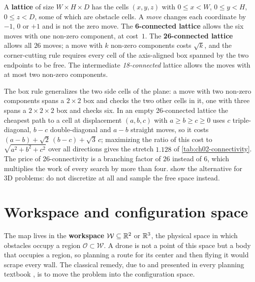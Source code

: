 \begin{definition}
\label{def:ch02-lattice}
A \textbf{lattice} of size $W\times H\times D$ has the cells $(x,y,z)$ with $0\le x<W$, $0\le y<H$, $0\le z<D$, some of which are obstacle cells. A \emph{move} changes each coordinate by $-1$, $0$ or $+1$ and is not the zero move. The \textbf{6-connected lattice} allows the six moves with one non-zero component, at cost~$1$. The \textbf{26-connected lattice} allows all $26$ moves; a move with $k$ non-zero components costs $\sqrt{k}$, and the corner-cutting rule requires every cell of the axis-aligned box spanned by the two endpoints to be free. The intermediate \emph{18-connected} lattice allows the moves with at most two non-zero components.
\end{definition}

The box rule generalizes the two side cells of the plane: a move with two non-zero components spans a $2\times2$ box and checks the two other cells in it, one with three spans a $2\times2\times2$ box and checks six. In an empty 26-connected lattice the cheapest path to a cell at displacement $(a,b,c)$ with $a\ge b\ge c\ge0$ uses $c$ triple-diagonal, $b-c$ double-diagonal and $a-b$ straight moves, so it costs $(a-b)+\sqrt2\,(b-c)+\sqrt3\,c$; maximizing the ratio of this cost to $\sqrt{a^2+b^2+c^2}$ over all directions gives the stretch $1.128$ of \cref{tab:ch02-connectivity}. The price of 26-connectivity is a branching factor of $26$ instead of $6$, which multiplies the work of every search by more than four.  show the alternative for 3D problems: do not discretize at all and sample the free space instead.

\section{Workspace and configuration space}
\label{sec:ch02-cspace}

The map lives in the \textbf{workspace} $\mathcal{W}\subseteq\mathbb{R}^2$ or $\mathbb{R}^3$, the physical space in which obstacles occupy a region $\mathcal{O}\subset\mathcal{W}$. A drone is not a point of this space but a body that occupies a region, so planning a route for its center and then flying it would scrape every wall. The classical remedy, due to \textcite{lozanoperez1983spatial} and presented in every planning textbook \cite{lozanoperez1983spatial,lavalle2006planning,choset2005principles}, is to move the problem into the configuration space.

